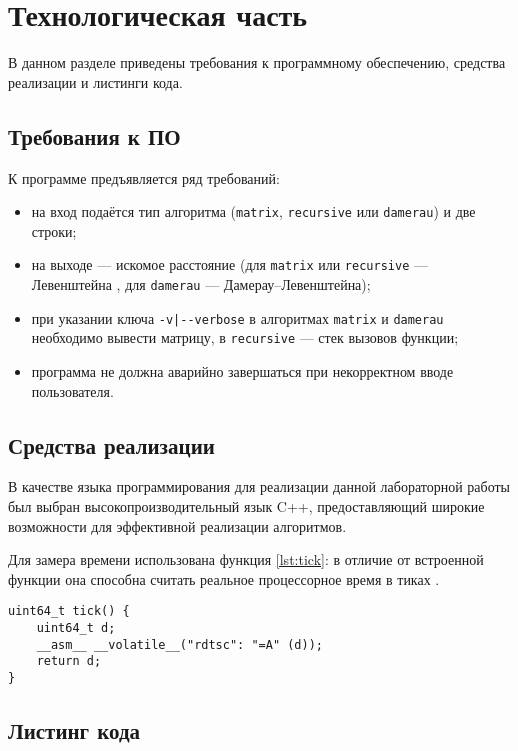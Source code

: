 \chapter{Технологическая часть}

В данном разделе приведены требования к программному обеспечению, средства реализации и листинги кода.

\section{Требования к ПО}

К программе предъявляется ряд требований:
\begin{itemize}
	\item на вход подаётся тип алгоритма (\texttt{matrix}, \texttt{recursive} или \texttt{damerau}) и две строки;
	\item на выходе — искомое расстояние (для \texttt{matrix} или \texttt{recursive} — Левенштейна , для \texttt{damerau} — Дамерау--Левенштейна);
	\item при указании ключа \texttt{-v|{-}-verbose} в алгоритмах \texttt{matrix} и \texttt{damerau} необходимо вывести матрицу, в \texttt{recursive} — стек вызовов функции;
	\item программа не должна аварийно завершаться при некорректном вводе пользователя.
\end{itemize}

\section{Средства реализации}

В качестве языка программирования для реализации данной лабораторной работы был выбран высокопроизводительный язык C++, предоставляющий широкие возможности для эффективной реализации алгоритмов.

Для замера времени использована функция \ref{lst:tick}: в отличие от встроенной функции  она способна считать реальное процессорное время в тиках \cite{Kurnosov}.

\begin{lstlisting}[caption={Функция замера процессорного времени},label={lst:tick},style={cpp}]
uint64_t tick() {
	uint64_t d;
	__asm__ __volatile__("rdtsc": "=A" (d));
	return d;
}
\end{lstlisting}
\section{Листинг кода}

